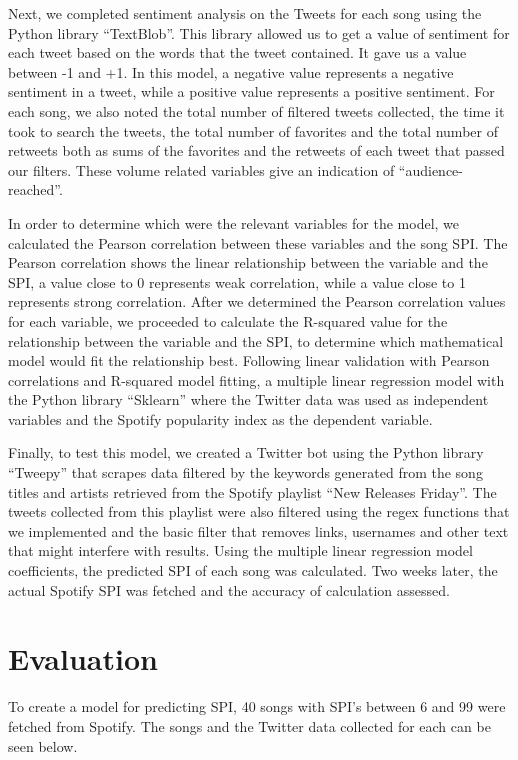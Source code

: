 \documentclass[12pt,conference]{IEEEtran}
\begin{document}
Next, we completed sentiment analysis on the Tweets for each song using the Python library ``TextBlob''. This library allowed us to get a value of sentiment for each tweet based on the words that the tweet contained. It gave us a value between -1 and +1. In this model, a negative value represents a negative sentiment in a tweet, while a positive value represents a positive sentiment. For each song, we also noted the total number of filtered tweets collected, the time it took to search the tweets, the total number of favorites and the total number of retweets both as sums of the favorites and the retweets of each tweet that passed our filters. These volume related variables give an indication of ``audience-reached''. \par

In order to determine which were the relevant variables for the model, we calculated the Pearson correlation between these variables and the song SPI. The Pearson correlation shows the linear relationship between the variable and the SPI, a value close to 0 represents weak correlation, while a value close to 1 represents strong correlation. After we determined the Pearson correlation values for each variable, we proceeded to calculate the R-squared value for the relationship between the variable and the SPI, to determine which mathematical model would fit the relationship best. Following linear validation with Pearson correlations and R-squared model fitting, a multiple linear regression model with the Python library ``Sklearn'' where the Twitter data was used as independent variables and the Spotify popularity index as the dependent variable.\par 

Finally, to test this model, we created a Twitter bot using the Python library ``Tweepy'' that scrapes data filtered by the keywords generated from the song titles and artists retrieved from the Spotify playlist ``New Releases Friday''. The tweets collected from this playlist were also filtered using the regex functions that we implemented and the basic filter that removes links, usernames and other text that might interfere with results. Using the multiple linear regression model coefficients, the predicted SPI of each song was calculated. Two weeks later, the actual Spotify SPI was fetched and the accuracy of calculation assessed.  \par

\section{Evaluation}
To create a model for predicting SPI, 40 songs with SPI’s between 6 and 99 were fetched from Spotify. The songs and the Twitter data collected for each can be seen below. \par
\end{document}
